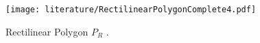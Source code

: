 \begin{figure}[h!]
    \centering
    \texttt{[image: literature/RectilinearPolygonComplete4.pdf]}
    \caption{Rectilinear Polygon $P_R$ \cite{1057165}.}
    \label{fig:rectilinear}
\end{figure}
